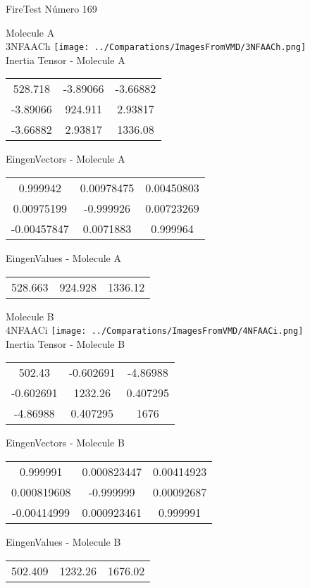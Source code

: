 \vtab[-2cm]
\begin{center}
{\large FireTest \tab Número 169}
\end{center}
\begin{multicols}{2}
\begin{center}

Molecule A \\ 
3NFAACh
\texttt{[image: ../Comparations/ImagesFromVMD/3NFAACh.png]}
\\
Inertia Tensor - Molecule A \\
\vtab

\begin{tabular}{|c c c|}
528.718	 & 	-3.89066	 & 	-3.66882	 \\
-3.89066	 & 	924.911	 & 	2.93817	 \\
-3.66882	 & 	2.93817	 & 	1336.08
\end{tabular}

\vtab
 EingenVectors - Molecule A     \\
\vtab
\begin{tabular}{|c c c|}
0.999942	 & 	0.00978475	 & 	0.00450803	 \\
0.00975199	 & 	-0.999926	 & 	0.00723269	 \\
-0.00457847	 & 	0.0071883	 & 	0.999964
\end{tabular}

\vtab
 EingenValues - Molecule A     \\
\vtab
\begin{tabular}{|c c c|}
528.663	 & 	924.928	 & 	1336.12	 \\
\end{tabular}
\columnbreak

Molecule B \\ 
4NFAACi
\texttt{[image: ../Comparations/ImagesFromVMD/4NFAACi.png]}
\\
Inertia Tensor - Molecule B \\
\vtab

\begin{tabular}{|c c c|}
502.43	 & 	-0.602691	 & 	-4.86988	 \\
-0.602691	 & 	1232.26	 & 	0.407295	 \\
-4.86988	 & 	0.407295	 & 	1676
\end{tabular}

\vtab
 EingenVectors - Molecule B     \\
\vtab
\begin{tabular}{|c c c|}
0.999991	 & 	0.000823447	 & 	0.00414923	 \\
0.000819608	 & 	-0.999999	 & 	0.00092687	 \\
-0.00414999	 & 	0.000923461	 & 	0.999991
\end{tabular}

\vtab
 EingenValues - Molecule B     \\
\vtab
\begin{tabular}{|c c c|}
502.409	 & 	1232.26	 & 	1676.02	 \\
\end{tabular}

\end{center}
\end{multicols}
